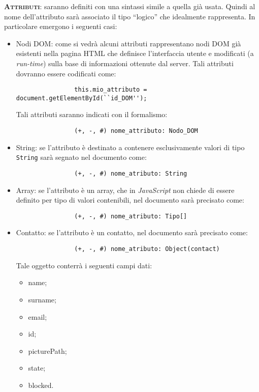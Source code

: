 \begin{description}
	\item{\scshape\bfseries Attributi}: saranno definiti con una sintassi simile a quella già usata. Quindi al nome dell'attributo sarà associato il tipo ``logico'' che idealmente rappresenta. In particolare emergono i seguenti casi:
		\begin{itemize}
			\item Nodi DOM: come si vedrà alcuni attributi rappresentano nodi DOM già esistenti nella pagina HTML che definisce l'interfaccia utente e modificati (a \textit{run-time}) sulla base di informazioni ottenute dal server. Tali attributi dovranno essere codificati come:
			
			\begin{verbatim}
				this.mio_attributo = document.getElementById(``id_DOM'');
			\end{verbatim}
			
			Tali attributi saranno indicati con il formalismo:
			
			\begin{verbatim}
				(+, -, #) nome_attributo: Nodo_DOM
			\end{verbatim}
			
			\item String: se l'attributo è destinato a contenere esclusivamente valori di tipo \texttt{String} sarà segnato nel documento come:
			
			\begin{verbatim}
				(+, -, #) nome_atributo: String
			\end{verbatim}
			
			\item Array: se l'attributo è un array, che in \textit{JavaScript} non chiede di essere definito per tipo di valori contenibili, nel documento sarà precisato come:
			
			\begin{verbatim}
				(+, -, #) nome_atributo: Tipo[]
			\end{verbatim}
			
			\item Contatto: se l'attributo è un contatto, nel documento sarà precisato come:
			
			\begin{verbatim}
				(+, -, #) nome_atributo: Object(contact)
			\end{verbatim}
			Tale oggetto conterrà i seguenti campi dati:
			\begin{itemize}
			\item name;
			\item surname;
			\item email;
			\item id;
			\item picturePath;
			\item state;
			\item blocked.
			\end{itemize}


\end{itemize}
\end{description}
